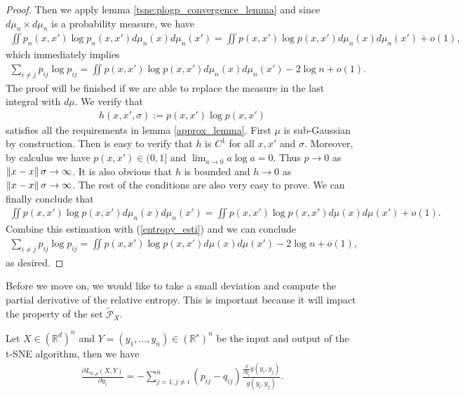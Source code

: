 \begin{proof}
    Then we apply lemma \ref{tsne:plogp_convergence_lemma} and since $d \mu_n
        \times d \mu_n$ is a probability measure, we have
    \begin{align}
        \iint p_n(x,x')\log p_n(x,x') d\mu_n(x)d\mu_n(x') = \iint p(x,x')\log p(x,x') d\mu_n(x)d\mu_n(x') +o(1),
    \end{align}
    which immediately implies
    \begin{align} \label{entropy_esti}
        \sum_{i \neq j}p_{ij} \log p_{ij} = \iint p(x,x')\log p(x,x') d\mu_n(x)d\mu_n(x') -2 \log n + o(1).
    \end{align}
    The proof will be finished if we are able to replace the measure in the last integral with $d \mu$. We verify that
    \begin{align}
        h(x,x',\sigma) :=  p(x,x')\log p(x,x')
    \end{align}
    satisfies all the requirements in lemma \ref{approx_lemma}. First $\mu$ is sub-Gaussian by construction. Then is easy to verify that $h$ is $C^1$ for all $x,x'$ and $\sigma$. Moreover, by calculus we have $p(x,x') \in (0,1]$ and $\lim_{a \to 0} a \log a = 0$. Thus $p \to 0$ as $\left\lVert x-x\right\rVert\sigma \to \infty$. It is also obvious that $h$ is bounded and $h \to 0$ as $\left\lVert x-x\right\rVert\sigma \to \infty$. The rest of the conditions are also very easy to prove. We can finally conclude that
    \begin{align}
        \iint p(x,x')\log p(x,x') d\mu_n(x)d\mu_n(x') = \iint p(x,x')\log p(x,x') d\mu(x)d\mu(x') + o(1).
    \end{align}
    Combine this estimation with (\ref{entropy_esti}) and we can conclude
    \begin{align}
        \sum_{i \neq j}p_{ij} \log p_{ij} = \iint p(x,x')\log p(x,x') d\mu(x)d\mu(x') - 2\log n + o(1),
    \end{align}
    as desired.
\end{proof}
Before we move on, we would like to take a small deviation and compute the
partial derivative of the relative entropy. This is important because it will
impact the property of the set $\tilde{\mathcal{P}}_X$.
\begin{lemma} \label{derivative_lemma}
    Let $X \in (\mathbb{R}^d)^n$ and $Y = (y_1,\dots,y_n)\in (\mathbb{R}^s)^n$ be the input and output of the t-SNE algorithm, then we have
    \begin{align}
        \frac{\partial L_{n, \rho}(X,Y)}{\partial y_i} = -\sum_{j=1, j \neq i}^n (p_{ij}-q_{ij}) \frac{\frac{\partial}{\partial y_i}g(y_i,y_j)}{g(y_i,y_j)}.
    \end{align}
\end{lemma}
